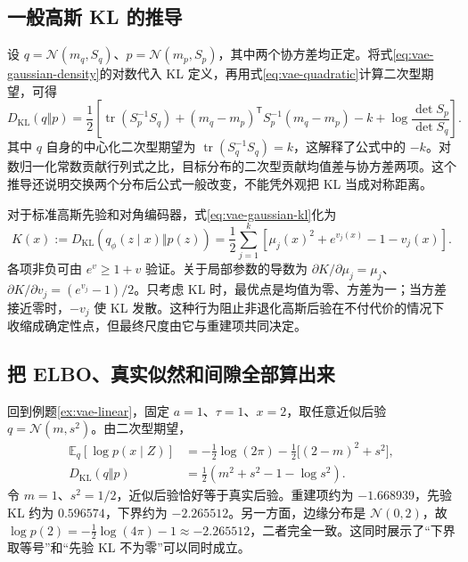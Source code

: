 \documentclass[UTF8,12pt,a4paper,fontset=fandol]{ctexart}
\begin{document}
\subsection{一般高斯 KL 的推导}
设 $q=\mathcal N(m_q,S_q)$、$p=\mathcal N(m_p,S_p)$，其中两个协方差均正定。将式\eqref{eq:vae-gaussian-density}的对数代入 KL 定义，再用式\eqref{eq:vae-quadratic}计算二次型期望，可得
\begin{equation}
 D_{\mathrm{KL}}(q\Vert p)=\frac12\left[
 \operatorname{tr}(S_p^{-1}S_q)
 +(m_q-m_p)^\mathsf T S_p^{-1}(m_q-m_p)-k
 +\log\frac{\det S_p}{\det S_q}\right].
 \label{eq:vae-gaussian-kl}
\end{equation}
其中 $q$ 自身的中心化二次型期望为 $\operatorname{tr}(S_q^{-1}S_q)=k$，这解释了公式中的 $-k$。对数归一化常数贡献行列式之比，目标分布的二次型贡献均值差与协方差两项。这个推导还说明交换两个分布后公式一般改变，不能凭外观把 KL 当成对称距离。

对于标准高斯先验和对角编码器，式\eqref{eq:vae-gaussian-kl}化为
\begin{equation}
 K(x):=D_{\mathrm{KL}}(q_\phi(z\mid x)\Vert p(z))
 =\frac12\sum_{j=1}^{k}\left[\mu_j(x)^2+e^{v_j(x)}-1-v_j(x)\right].
 \label{eq:vae-diagonal-kl}
\end{equation}
各项非负可由 $e^v\geq1+v$ 验证。关于局部参数的导数为 $\partial K/\partial\mu_j=\mu_j$、$\partial K/\partial v_j=(e^{v_j}-1)/2$。只考虑 KL 时，最优点是均值为零、方差为一；当方差接近零时，$-v_j$ 使 KL 发散。这种行为阻止非退化高斯后验在不付代价的情况下收缩成确定性点，但最终尺度由它与重建项共同决定。

\subsection{把 ELBO、真实似然和间隙全部算出来}
回到例题\ref{ex:vae-linear}，固定 $a=1$、$\tau=1$、$x=2$，取任意近似后验 $q=\mathcal N(m,s^2)$。由二次型期望，
\begin{align}
 \mathbb E_q[\log p(x\mid Z)]
 &=-\frac12\log(2\pi)-\frac12\bigl[(2-m)^2+s^2\bigr],
 \label{eq:vae-numerical-reconstruction}\\
 D_{\mathrm{KL}}(q\Vert p)
 &=\frac12(m^2+s^2-1-\log s^2).
 \label{eq:vae-numerical-kl}
\end{align}
令 $m=1$、$s^2=1/2$，近似后验恰好等于真实后验。重建项约为 $-1.668939$，先验 KL 约为 $0.596574$，下界约为 $-2.265512$。另一方面，边缘分布是 $\mathcal N(0,2)$，故 $\log p(2)=-\tfrac12\log(4\pi)-1\approx-2.265512$，二者完全一致。这同时展示了“下界取等号”和“先验 KL 不为零”可以同时成立。
\end{document}
